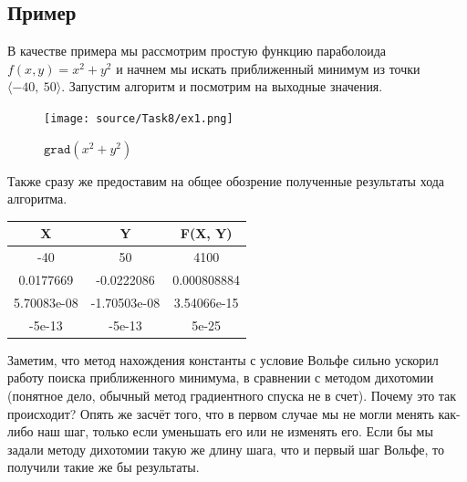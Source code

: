 \documentclass[12pt, a4paper, oneside, final]{article}
\begin{document}
	\subsection*{Пример}
	В качестве примера мы рассмотрим простую функцию параболоида $f(x, y) = x^{2} + y^{2}$ и начнем мы искать приближенный минимум из точки $\langle-40, ~ 50\rangle$. Запустим алгоритм и посмотрим на выходные значения.
	\begin{figure}[H]
		\centering
		\texttt{[image: source/Task8/ex1.png]}
		\caption{$\texttt{grad}(x^{2} + y^{2})$}
	\end{figure}
	Также сразу же предоставим на общее обозрение полученные результаты хода алгоритма.
	\begin{table}[H]
		\centering
		\begin{tabular}{|c|c|c|}
			\textbf{X} & \textbf{Y} & \textbf{F(X, Y)} \\ \hline
			-40 & 50 & 4100 \\
			0.0177669 & -0.0222086 & 0.000808884 \\
			5.70083e-08 & -1.70503e-08 & 3.54066e-15 \\
			-5e-13 & -5e-13 & 5e-25
		\end{tabular}
	\end{table}
	Заметим, что метод нахождения константы с условие Вольфе сильно ускорил работу поиска приближенного минимума, в сравнении с методом дихотомии (понятное дело, обычный метод градиентного спуска не в счет). Почему это так происходит? Опять же засчёт того, что в первом случае мы не могли менять как-либо наш шаг, только если уменьшать его или не изменять его. Если бы мы задали методу дихотомии такую же длину шага, что и первый шаг Вольфе, то получили такие же бы результаты.
\end{document}
